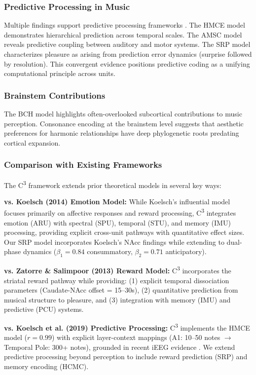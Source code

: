 \documentclass[9pt,onecolumn]{article}
\newcommand{\Cthree}{C\textsuperscript{3}}
\begin{document}
\subsubsection{Predictive Processing in Music}

Multiple findings support predictive processing frameworks \citep{koelsch2019}. The HMCE model demonstrates hierarchical prediction across temporal scales. The AMSC model reveals predictive coupling between auditory and motor systems. The SRP model characterizes pleasure as arising from prediction error dynamics (surprise followed by resolution). This convergent evidence positions predictive coding as a unifying computational principle across units.

\subsubsection{Brainstem Contributions}

The BCH model highlights often-overlooked subcortical contributions to music perception. Consonance encoding at the brainstem level suggests that aesthetic preferences for harmonic relationships have deep phylogenetic roots predating cortical expansion.

\subsubsection{Comparison with Existing Frameworks}

The \Cthree{} framework extends prior theoretical models in several key ways:

\textbf{vs. Koelsch (2014) Emotion Model:} While Koelsch's influential model \citep{koelsch2014} focuses primarily on affective responses and reward processing, \Cthree{} integrates emotion (ARU) with spectral (SPU), temporal (STU), and memory (IMU) processing, providing explicit cross-unit pathways with quantitative effect sizes. Our SRP model incorporates Koelsch's NAcc findings while extending to dual-phase dynamics ($\beta_1=0.84$ consummatory, $\beta_2=0.71$ anticipatory).

\textbf{vs. Zatorre \& Salimpoor (2013) Reward Model:} \Cthree{} incorporates the striatal reward pathway while providing: (1) explicit temporal dissociation parameters (Caudate-NAcc offset = 15--30s), (2) quantitative prediction from musical structure to pleasure, and (3) integration with memory (IMU) and predictive (PCU) systems.

\textbf{vs. Koelsch et al. (2019) Predictive Processing:} \Cthree{} implements the HMCE model ($r=0.99$) with explicit layer-context mappings (A1: 10--50 notes $\rightarrow$ Temporal Pole: 300+ notes), grounded in recent iEEG evidence \citep{koelsch2019}. We extend predictive processing beyond perception to include reward prediction (SRP) and memory encoding (HCMC).
\end{document}
